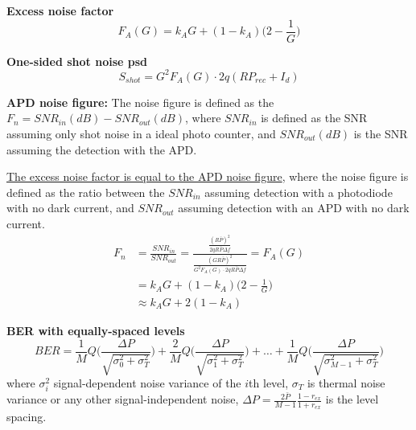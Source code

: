\documentclass[a4paper]{article}
\begin{document}
\textbf{Excess noise factor}
\begin{equation}
F_A(G) = k_AG + (1-k_A)\Big(2 - \frac{1}{G}\Big)
\end{equation}

\textbf{One-sided shot noise psd}
\begin{equation}
S_{shot} = G^2F_A(G)\cdot 2q(RP_{rec} + I_d)
\end{equation}

\textbf{APD noise figure:} The noise figure is defined as the $F_n = SNR_{in}(dB) - SNR_{out}(dB)$, where $SNR_{in}$ is defined as the SNR assuming only shot noise in a ideal photo counter, and $SNR_{out}(dB)$ is the SNR assuming the detection with the APD.

\underline{The excess noise factor is equal to the APD noise figure}, where the noise figure is defined as the ratio between the $SNR_{in}$ assuming detection with a photodiode with no dark current, and $SNR_{out}$ assuming detection with an APD with no dark current.
\begin{align}
F_n &= \frac{SNR_{in}}{SNR_{out}} = \frac{\frac{(R\bar{P})^2}{2qR\bar{P}\Delta f}}{\frac{(GR\bar{P})^2}{G^2F_A(G)\cdot 2qR\bar{P}\Delta f}} = F_A(G) \\ \nonumber
& = k_AG + (1-k_A)\Big(2 - \frac{1}{G}\Big) \\
& \approx k_AG + 2(1-k_A)
\end{align}

\textbf{BER with equally-spaced levels}
\begin{equation}
BER = \frac{1}{M}Q\bigg(\frac{\Delta P}{\sqrt{\sigma_{0}^2 + \sigma_T^2}}\bigg) + \frac{2}{M}Q\bigg(\frac{\Delta P}{\sqrt{\sigma_{1}^2 + \sigma_T^2}}\bigg) + \ldots + \frac{1}{M}Q\bigg(\frac{\Delta P}{\sqrt{\sigma_{M-1}^2 + \sigma_T^2}}\bigg)
\end{equation}
where $\sigma_{i}^2$ signal-dependent noise variance of the $i$th level, $\sigma_{T}$ is thermal noise variance or any other signal-independent noise, $\Delta P = \frac{2\bar{P}}{M-1}\frac{1-r_{ex}}{1 + r_{ex}}$ is the level spacing.

\
\end{document}
